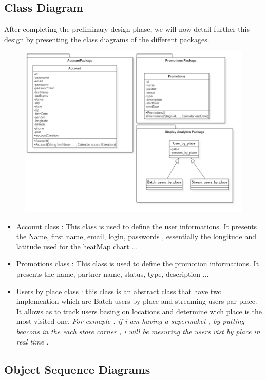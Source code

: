 \subsection{ Class Diagram }
After completing the preliminary design phase, 
we will now detail further this design by presenting the class diagrams of the different packages.
\begin{figure}[h!]
	\centering
	\includegraphics[height=0.4\textheight]{fig01/ClassDiagram}
	\label{fig:FilialesEtClients}
\end{figure}

 \begin{itemize}
	\item Account class : This class is used to define the user informations. 
	It presents the Name, first name, email, login, passwords , essentially the longitude and latitude used for the
	heatMap chart ...
	\item Promotions class : This class is used to define the promotion informations. 
	It presents the name, partner name, status, type, description ... 
	\item Users by place class : this class is an abstract class that have two implemention which are Batch users by place and streaming
	users par place. It allows as to track users basing on locations and determine wich place is the most visited one.
	\textit{For exmaple : if i am having a supermaket , by putting beacons in the each store corner , i will be mesuring the users
	vist by place in real time .}
\end{itemize}

\subsection{Object Sequence Diagrams}

